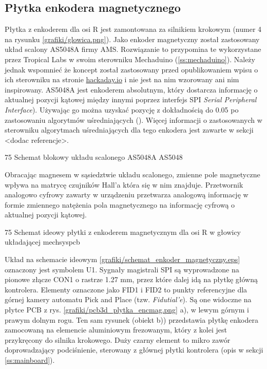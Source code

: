 \subsection{Płytka enkodera magnetycznego}
\label{ss:encmag}

Płytka z enkoderem dla osi R jest zamontowana za silnikiem krokowym (numer 4 na rysunku \ref{grafiki/glowica.png}). Jako enkoder magnetyczny został zastosowany układ scalony AS5048A firmy AMS. Rozwiązanie to przypomina te wykorzystane przez Tropical Labs w swoim sterowniku Mechaduino (\ref{ss:mechaduino}). Należy jednak wspomnieć że koncept został zastosowany przed opublikowaniem wpisu o ich sterowniku na stronie \url{hackaday.io} i nie jest na nim wzorowany ani nim inspirowany. AS5048A jest enkoderem absolutnym, który dostarcza informację o aktualnej pozycji kątowej między innymi poprzez interfejs SPI {\it Serial Peripheral Interface}). Używając go można uzyskać pozycję z dokładnością do 0.05\degree{} po zastosowaniu algorytmów uśredniających (\cite{AS5048}). Więcej informacji o zastosowanych w sterowniku algorytmach uśredniających dla tego enkodera jest zawarte w sekcji <dodac referencje>.

	{75}
	{Schemat blokowy układu scalonego AS5048A}
	{AS5048}
	
Obracając magnesem w sąsiedztwie układu scalonego, zmienne pole magnetyczne wpływa na matrycę czujników Hall'a która się w nim znajduje. Przetwornik analogowo cyfrowy zawarty w urządzeniu przetwarza analogową informację w formie zmiennego natężenia pola magnetycznego na informację cyfrową o aktualnej pozycji kątowej.

	{75}
	{Schemat ideowy płytki z enkoderem magnetycznym dla osi R w głowicy układającej}
	{mechsyspcb}
	
Układ na schemacie ideowym \ref{grafiki/schemat_enkoder_magnetyczny.eps} oznaczony jest symbolem U1. Sygnały magistrali SPI są wyprowadzone na pionowe złącze CON1 o rastrze 1.27 mm, przez które dalej idą na płytkę główną kontrolera. Elementy oznaczone jako FID1 i FID2 to punkty referencyjne dla górnej kamery automatu Pick and Place (tzw. {\it Fidutial'e}). Są one widoczne na płytce PCB z rys. \ref{grafiki/pcb3d_plytka_encmag.png} a), w lewym górnym i prawym dolnym rogu. Ten sam rysunek (obiekt b)) przedstawia płytkę enkodera zamocowaną na elemencie aluminiowym frezowanym, który z kolei jest przykręcony do silnika krokowego. Duży czarny element to mikro zawór doprowadzający podciśnienie, sterowany z głównej płytki kontrolera (opis w sekcji \ref{ss:mainboard}). \\

